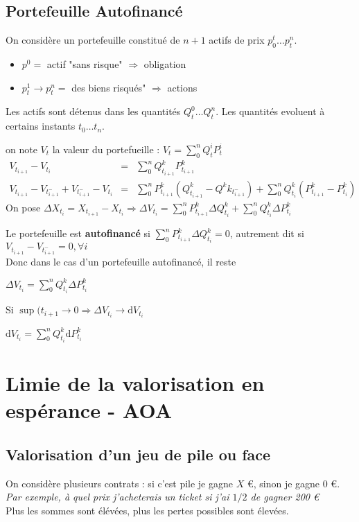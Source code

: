 \documentclass{report}
\begin{document}
\subsection{Portefeuille Autofinancé}
On considère un portefeuille constitué de $n+1$ actifs de prix $p_0^t\dots p^n_t$.
\begin{itemize}
    \item $p^0 = $ actif "sans risque" $\Rightarrow$ obligation
    \item $p^1_t\to p^n_t = $ des biens risqués" $\Rightarrow$ actions
\end{itemize}
Les actifs sont détenus dans les quantités $Q_t^0\dots Q^n_t$. Les quantités evoluent à certains instants $t_0\dots t_n$.

on note $V_t$ la valeur du portefueille : $V_t = \displaystyle\sum_0^n Q_t^iP_t^i$
\begin{eqnarray}
V_{t_{i+1}}-V_{t_i} & = & \displaystyle\sum_0^n Q^k_{t_{i+1}}P^k_{t_{i+1}} \nonumber \\
V_{t_{i+1}}-V_{t^-_{i+1}}+V_{t^-_{i+1}}-V_{t_i} & = & \displaystyle\sum_0^n P^k_{t_{i+1}}\left(Q^k_{t_{i+1}}-Q^kk_{t^-_{i+1}}\right) + \displaystyle\sum_0^n Q^k_{t_{i}}\left(P^k_{t_{i+1}}-P^k_{t_i}\right)\nonumber
\end{eqnarray}
On pose $\Delta X_{t_i} = X_{t_{i+1}}-X_{t_i} \Rightarrow \Delta V_{t_i} = \displaystyle\sum_0^n P^k_{t_{i+1}}\Delta Q^k_{t_i} + \displaystyle\sum_0^n Q^k_{t_{i}}\Delta P^k_{t_{i}}$

Le portefeuille est \textbf{autofinancé} si $\displaystyle\sum_0^n P^k_{t_{i+1}}\Delta Q^k_{t_i} = 0$, autrement dit si $V_{t_{i+1}}-V_{t^-_{i+1}} = 0, \forall i$\\
Donc dans le cas d'un portefeuille autofinancé, il reste 
\begin{center}
    $\Delta V_{t_i} = \displaystyle\sum_0^n Q^k_{t_{i}}\Delta P^k_{t_{i}}$
\end{center}
Si $\sup(t_{i+1}\to 0 \Rightarrow \Delta V_{t_i} \to \mathrm{d}V_{t_i}$
\begin{center}
    $\mathrm{d} V_{t_i} = \displaystyle\sum_0^n Q^k_{t_{i}}\mathrm{d} P^k_{t_{i}}$
\end{center}

\vspace{3cm}
\section{Limie de la valorisation en espérance - AOA}
\subsection{Valorisation d'un jeu de pile ou face}
On considère plusieurs contrats : si c'est pile je gagne $X$ \euro, sinon je gagne 0 \euro.\\
\textit{Par exemple, à quel prix j'acheterais un ticket si j'ai $1/2$ de gagner 200 \euro}\\
Plus les sommes sont élévées, plus les pertes possibles sont élevées. \\
\end{document}
